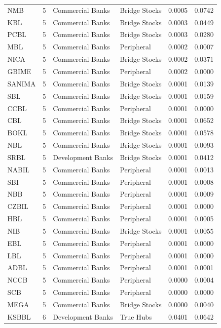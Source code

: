 \begin{longtable}{l r l l r r}
NMB & 5 & Commercial Banks & Bridge Stocks & 0.0005 & 0.0742 \\
KBL & 5 & Commercial Banks & Bridge Stocks & 0.0003 & 0.0449 \\
PCBL & 5 & Commercial Banks & Bridge Stocks & 0.0003 & 0.0280 \\
MBL & 5 & Commercial Banks & Peripheral & 0.0002 & 0.0007 \\
NICA & 5 & Commercial Banks & Bridge Stocks & 0.0002 & 0.0371 \\
GBIME & 5 & Commercial Banks & Peripheral & 0.0002 & 0.0000 \\
SANIMA & 5 & Commercial Banks & Bridge Stocks & 0.0001 & 0.0139 \\
SBL & 5 & Commercial Banks & Bridge Stocks & 0.0001 & 0.0159 \\
CCBL & 5 & Commercial Banks & Peripheral & 0.0001 & 0.0000 \\
CBL & 5 & Commercial Banks & Bridge Stocks & 0.0001 & 0.0652 \\
BOKL & 5 & Commercial Banks & Bridge Stocks & 0.0001 & 0.0578 \\
NBL & 5 & Commercial Banks & Bridge Stocks & 0.0001 & 0.0093 \\
SRBL & 5 & Development Banks & Bridge Stocks & 0.0001 & 0.0412 \\
NABIL & 5 & Commercial Banks & Peripheral & 0.0001 & 0.0013 \\
SBI & 5 & Commercial Banks & Peripheral & 0.0001 & 0.0008 \\
NBB & 5 & Commercial Banks & Peripheral & 0.0001 & 0.0009 \\
CZBIL & 5 & Commercial Banks & Peripheral & 0.0001 & 0.0000 \\
HBL & 5 & Commercial Banks & Peripheral & 0.0001 & 0.0005 \\
NIB & 5 & Commercial Banks & Bridge Stocks & 0.0001 & 0.0055 \\
EBL & 5 & Commercial Banks & Peripheral & 0.0001 & 0.0000 \\
LBL & 5 & Commercial Banks & Peripheral & 0.0001 & 0.0000 \\
ADBL & 5 & Commercial Banks & Peripheral & 0.0001 & 0.0001 \\
NCCB & 5 & Commercial Banks & Peripheral & 0.0000 & 0.0004 \\
SCB & 5 & Commercial Banks & Peripheral & 0.0000 & 0.0000 \\
MEGA & 5 & Commercial Banks & Bridge Stocks & 0.0000 & 0.0040 \\
KSBBL & 6 & Development Banks & True Hubs & 0.0401 & 0.0642 \\

\end{longtable}
